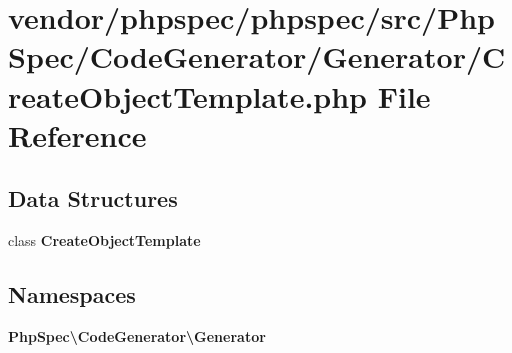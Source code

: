 \section{vendor/phpspec/phpspec/src/\+Php\+Spec/\+Code\+Generator/\+Generator/\+Create\+Object\+Template.php File Reference}
\label{_create_object_template_8php}
\subsection*{Data Structures}
\begin{DoxyCompactItemize}
\item 
class {\bf Create\+Object\+Template}
\end{DoxyCompactItemize}
\subsection*{Namespaces}
\begin{DoxyCompactItemize}
\item 
 {\bf Php\+Spec\textbackslash{}\+Code\+Generator\textbackslash{}\+Generator}
\end{DoxyCompactItemize}
